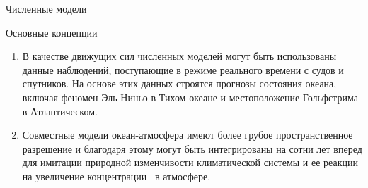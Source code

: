 \begin{chapter}{Численные модели}
\begin{section}{Основные концепции}
\begin{enumerate}
\item
В качестве движущих сил численных моделей могут быть использованы данные
наблюдений, поступающие в режиме реального времени с судов и спутников. 
На основе этих данных строятся прогнозы состояния океана, включая феномен
Эль-Ниньо в Тихом океане и местоположение Гольфстрима%
 в Атлантическом.
%

\item
Совместные модели океан-атмосфера имеют более грубое пространственное
разрешение и благодаря этому могут быть интегрированы на сотни лет вперед
для имитации природной изменчивости климатической системы и ее реакции на
увеличение концентрации~\COtwo{} в атмосфере.
%
\end{enumerate}
\end{section}

\end{chapter}